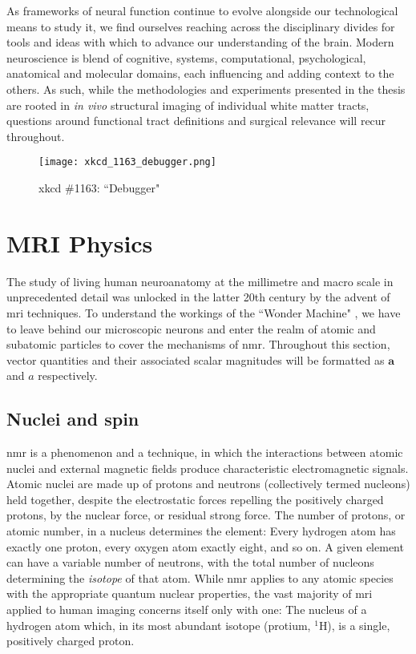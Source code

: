 As frameworks of neural function continue to evolve alongside our technological means to study it, we find ourselves reaching across the disciplinary divides for tools and ideas with which to advance our understanding of the brain.
Modern neuroscience is blend of cognitive, systems, computational, psychological, anatomical and molecular domains, each influencing and adding context to the others.
As such, while the methodologies and experiments presented in the thesis are rooted in \textit{in vivo} structural imaging of individual white matter tracts, questions around functional tract definitions and surgical relevance will recur throughout.

\begin{figure}[bh!]
  \centering
  \texttt{[image: xkcd\_1163\_debugger.png]}
  \caption{xkcd \#1163: ``Debugger"}
  \label{fig:xkcd}
\end{figure}

\section{MRI Physics}

The study of living human neuroanatomy at the millimetre and macro scale in unprecedented detail was unlocked in the latter 20th century by the advent of \gls{mri} techniques.
To understand the workings of the ``Wonder Machine" , we have to leave behind our microscopic neurons and enter the realm of atomic and subatomic particles to cover the mechanisms of \gls{nmr}.
Throughout this section, vector quantities and their associated scalar magnitudes will be formatted as $\mathbf{a}$ and $a$ respectively.

\subsection{Nuclei and spin}

\gls{nmr} is a phenomenon and a technique, in which the interactions between atomic nuclei and external magnetic fields produce characteristic electromagnetic signals.
Atomic nuclei are made up of protons and neutrons (collectively termed nucleons) held together, despite the electrostatic forces repelling the positively charged protons, by the nuclear force, or residual strong force.
The number of protons, or atomic number, in a nucleus determines the element: Every hydrogen atom has exactly one proton, every oxygen atom exactly eight, and so on.
A given element can have a variable number of neutrons, with the total number of nucleons determining the \textit{isotope} of that atom.
While \gls{nmr} applies to any atomic species with the appropriate quantum nuclear properties, the vast majority of \gls{mri} applied to human imaging concerns itself only with one:
The nucleus of a hydrogen atom which, in its most abundant isotope (protium, $^1$H), is a single, positively charged proton.

